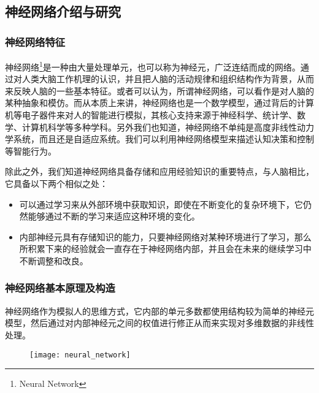 \subsection{神经网络介绍与研究}
\subsubsection{神经网络特征}
神经网络\footnote{Neural Network}是一种由大量处理单元，也可以称为神经元，广泛连结而成的网络。通过对人类大脑工作机理的认识，并且把人脑的活动规律和组织结构作为背景，从而来反映人脑的一些基本特征\supercite{61}。或者可以认为，所谓神经网络，可以看作是对人脑的某种抽象和模仿。而从本质上来讲，神经网络也是一个数学模型，通过背后的计算机等电子器件来对人的智能进行模拟，其核心支持来源于神经科学、统计学、数学、计算机科学等多种学科。另外我们也知道，神经网络不单纯是高度非线性动力学系统，而且还是自适应系统。我们可以利用神经网络模型来描述认知决策和控制等智能行为。

除此之外，我们知道神经网络具备存储和应用经验知识的重要特点，与人脑相比，它具备以下两个相似之处：
\begin{itemize}[noitemsep,topsep=0pt,parsep=0pt,partopsep=0pt]
	\item 可以通过学习来从外部环境中获取知识，即使在不断变化的复杂环境下，它仍然能够通过不断的学习来适应这种环境的变化。
	\item 内部神经元具有存储知识的能力，只要神经网络对某种环境进行了学习，那么所积累下来的经验就会一直存在于神经网络内部，并且会在未来的继续学习中不断调整和改良。
\end{itemize}

\subsubsection{神经网络基本原理及构造}
神经网络作为模拟人的思维方式，它内部的单元多数都使用结构较为简单的神经元模型，然后通过对内部神经元之间的权值进行修正从而来实现对多维数据的非线性处理\supercite{61}。

\begin{figure}[!hbp]
  \centering
  \begin{minipage}[b]{0.6\textwidth}
    \captionstyle{\centering}
    \centering
    \texttt{[image: neural\_network]}
  \end{minipage}     
\end{figure}

